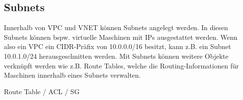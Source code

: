 \subsection{Subnets}
Innerhalb von VPC und VNET können Subnets angelegt werden. In diesen Subnets können bspw. virtuelle Maschinen mit IPs ausgestattet werden. Wenn also ein VPC ein CIDR-Präfix von 10.0.0.0/16 besitzt, kann z.B. ein Subnet 10.0.1.0/24 \glqq herausgeschnitten\grqq{} werden. Mit Subnets können weitere Objekte verknüpft werden wie z.B. Route Tables, welche die Routing-Informationen für Maschinen innerhalb eines Subnets verwalten.



Route Table / ACL / SG
